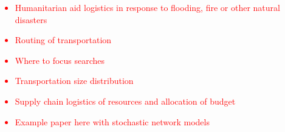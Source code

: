 \textcolor{red}{
\begin{itemize}
\item{Humanitarian aid logistics in response to flooding, fire or other natural disasters}
\item{Routing of transportation}
\item{Where to focus searches}
\item{Transportation size distribution}
\item{Supply chain logistics of resources and allocation of budget}
\item{Example paper here with stochastic network models~\cite{alem2016stochastic}}
\end{itemize}
}